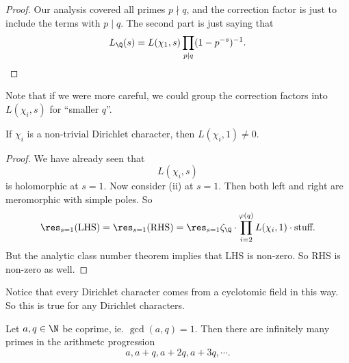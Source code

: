 \documentclass[a4paper]{article}
\begin{document}
\begin{proof}
  Our analysis covered all primes $p \nmid q$, and the correction factor is just to include the terms with $p \mid q$. The second part is just saying that
  \[
    L_\Q(s) = L(\chi_1, s) \prod_{p \mid q}(1 - p^{-s})^{-1}.
  \]
\end{proof}
Note that if we were more careful, we could group the correction factors into $L(\chi_i, s)$ for ``smaller $q$''.

\begin{cor}
  If $\chi_i$ is a non-trivial Dirichlet character, then $L(\chi_i, 1) \not= 0$.
\end{cor}

\begin{proof}
  We have already seen that
  \[
    L(\chi_i, s)
  \]
  is holomorphic at $s = 1$. Now consider (ii) at $s = 1$. Then both left and right are meromorphic with simple poles. So
  \[
    \res_{s = 1}(\text{LHS}) = \res_{s = 1}(\text{RHS}) = \res_{s = 1}\zeta_\Q \cdot \prod_{i = 2}^{\varphi(q)}L(\chi_i, 1) \cdot \text{stuff}.
  \]
  But the analytic class number theorem implies that LHS is non-zero. So RHS is non-zero as well.
\end{proof}

Notice that every Dirichlet character comes from a cyclotomic field in this way. So this is true for any Dirichlet characters.

\begin{thm}[Dirichlet, 1839]
  Let $a, q \in \N$ be coprime, ie. $\gcd(a, q) = 1$. Then there are infinitely many primes in the arithmetc progression
  \[
    a, a + q, a + 2q, a + 3q, \cdots.
  \]
\end{thm}
\end{document}
